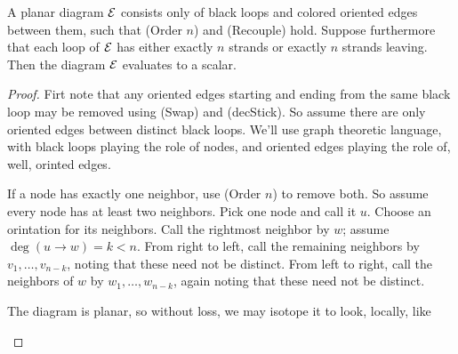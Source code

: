 \begin{lemma}\label{lem:decorated-graph}
    A planar diagram $\mathcal{E}$ consists only of black loops and colored oriented edges between them,
    such that (Order $n$) and (Recouple) hold. 
    Suppose furthermore that each loop of $\mathcal{E}$ has either exactly $n$ strands or exactly $n$ strands leaving.
    Then the diagram $\mathcal{E}$ evaluates to a scalar.
\end{lemma}

\begin{proof}
    Firt note that any oriented edges starting and ending from the same black loop may be removed
    using (Swap) and (decStick).
    So assume there are only oriented edges between distinct black loops.
    We'll use graph theoretic language, with black loops playing the role of nodes,
    and oriented edges playing the role of, well, orinted edges.

    If a node has exactly one neighbor, use (Order $n$) to remove both.
    So assume every node has at least two neighbors.
    Pick one node and call it $u$.
    Choose an orintation for its neighbors.
    Call the rightmost neighbor by $w$;
    assume $\deg(u\to w)=k<n$.
    From right to left, call the remaining neighbors by $v_1,\dots,v_{n-k}$, noting that
    these need not be distinct.
    From left to right, call the neighbors of $w$ by $w_1,\dots,w_{n-k}$, again noting that 
    these need not be distinct.

    The diagram is planar, so without loss, we may isotope it to look, locally, like
    \begin{center}
\end{center}
\end{proof}
